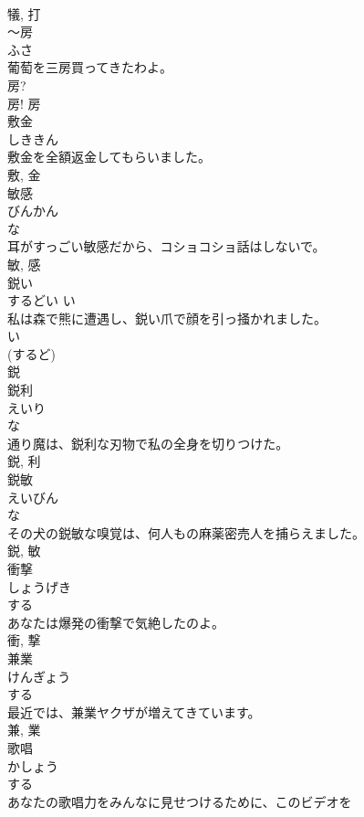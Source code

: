 \documentclass[8pt]{extreport}
\begin{document}
\begin{CJK}{UTF8}{min}
\\	犠, 打	
\\	〜房	
\\	ふさ	
\\	葡萄を三房買ってきたわよ。	
\\	房? 
\\	房!	房	
\\	敷金	
\\	しききん	
\\	敷金を全額返金してもらいました。	
\\	敷, 金	
\\	敏感	
\\	びんかん	
\\	な 
\\	耳がすっごい敏感だから、コショコショ話はしないで。	
\\	敏, 感	
\\	鋭い	
\\	するどい	い 
\\	私は森で熊に遭遇し、鋭い爪で顔を引っ掻かれました。	
\\	い 
\\	(するど) 
\\	鋭	
\\	鋭利	
\\	えいり	
\\	な 
\\	通り魔は、鋭利な刃物で私の全身を切りつけた。	
\\	鋭, 利	
\\	鋭敏	
\\	えいびん	
\\	な 
\\	その犬の鋭敏な嗅覚は、何人もの麻薬密売人を捕らえました。	
\\	鋭, 敏	
\\	衝撃	
\\	しょうげき	
\\	する 
\\	あなたは爆発の衝撃で気絶したのよ。	
\\	衝, 撃	
\\	兼業	
\\	けんぎょう	
\\	する 
\\	最近では、兼業ヤクザが増えてきています。	
\\	兼, 業	
\\	歌唱	
\\	かしょう	
\\	する 
\\	あなたの歌唱力をみんなに見せつけるために、このビデオを

\end{CJK}
\end{document}
